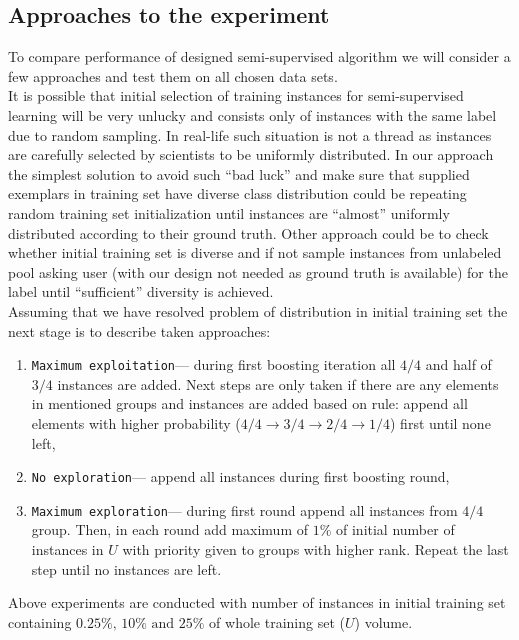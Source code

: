 \documentclass[12pt, a4paper, pdflatex]{report}
\begin{document}
\subsection{Approaches to the experiment\label{sec:experimetnapproach}}
To compare performance of designed semi-supervised algorithm we will consider a few approaches and test them on all chosen data sets.\\
It is possible that initial selection of training instances for semi-supervised learning will be very unlucky and consists only of instances with the same label due to random sampling. 
In real-life such situation is not a thread as instances are carefully selected by scientists to be uniformly distributed. 
In our approach the simplest solution to avoid such ``bad luck'' and make sure that supplied exemplars in training set have diverse class distribution could be repeating random training set initialization until instances are ``almost'' uniformly distributed according to their ground truth. Other approach could be to check whether initial training set is diverse and if not sample instances from unlabeled pool asking user (with our design not needed as ground truth is available) for the label until ``sufficient'' diversity is achieved.\\

Assuming that we have resolved problem of distribution in initial training set the next stage is to describe taken approaches:
\begin{enumerate}
\item \texttt{Maximum exploitation}--- during first boosting iteration all $4/4$ and half of $3/4$ instances are added. Next steps are only taken if there are any elements in mentioned groups and instances are added based on rule: append all elements with higher probability ($4/4\rightarrow3/4\rightarrow2/4\rightarrow1/4$) first until none left,
\item \texttt{No exploration}--- append all instances during first boosting round,
\item \texttt{Maximum exploration}--- during first round append all instances from $4/4$ group. Then, in each round add maximum of $1\%$ of initial number of instances in $U$ with priority given to groups with higher rank. Repeat the last step until no instances are left.
\end{enumerate}
Above experiments are conducted with number of instances in initial training set containing $0.25\%\text{, } 10\% \text{ and } 25\%$ of whole training set ($U$) volume.
\end{document}
